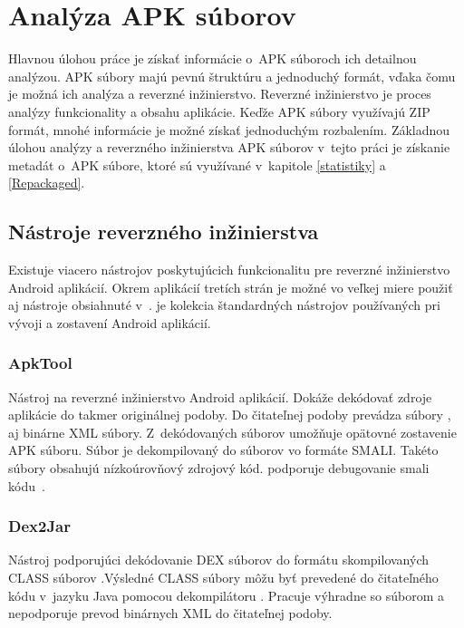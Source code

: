 \chapter{Analýza APK súborov}
\label{analyza}
Hlavnou úlohou práce je získať informácie o~APK súboroch ich detailnou analýzou. APK súbory majú pevnú štruktúru a jednoduchý formát, vďaka čomu je možná ich analýza a reverzné inžinierstvo. Reverzné inžinierstvo je proces analýzy funkcionality a obsahu aplikácie. Keďže APK súbory využívajú ZIP formát, mnohé informácie je možné získať jednoduchým rozbalením. Základnou úlohou analýzy a reverzného inžinierstva APK súborov v~tejto práci je získanie metadát o~APK súbore, ktoré sú využívané v~kapitole \ref{statistiky} a \ref{Repackaged}.

\section{Nástroje reverzného inžinierstva}
\label{nastroje_revezneho_inzinierstva}

Existuje viacero nástrojov poskytujúcich funkcionalitu pre reverzné inžinierstvo Android aplikácií. Okrem aplikácií tretích strán je možné vo veľkej miere použiť aj nástroje obsiahnuté v~. je kolekcia štandardných nástrojov používaných pri vývoji a zostavení Android aplikácií. 

\subsection{ApkTool}
\label{ApkTool}
Nástroj na reverzné inžinierstvo Android aplikácií. Dokáže dekódovať zdroje aplikácie do takmer originálnej podoby. Do čitateľnej podoby prevádza súbory ,  aj binárne XML súbory. Z~dekódovaných súborov umožňuje opätovné zostavenie APK súboru. Súbor  je dekompilovaný do súborov vo formáte SMALI. Takéto súbory obsahujú nízkoúrovňový zdrojový kód.  podporuje debugovanie smali kódu~\cite{apkTool}.

\subsection{Dex2Jar}
\label{Dex2Jar}
Nástroj podporujúci dekódovanie DEX súborov do formátu skompilovaných CLASS súborov .Výsledné CLASS súbory môžu byť prevedené do čitateľného kódu v~jazyku Java pomocou dekompilátoru . Pracuje výhradne so súborom  a nepodporuje prevod binárnych XML do čitateľnej podoby.

